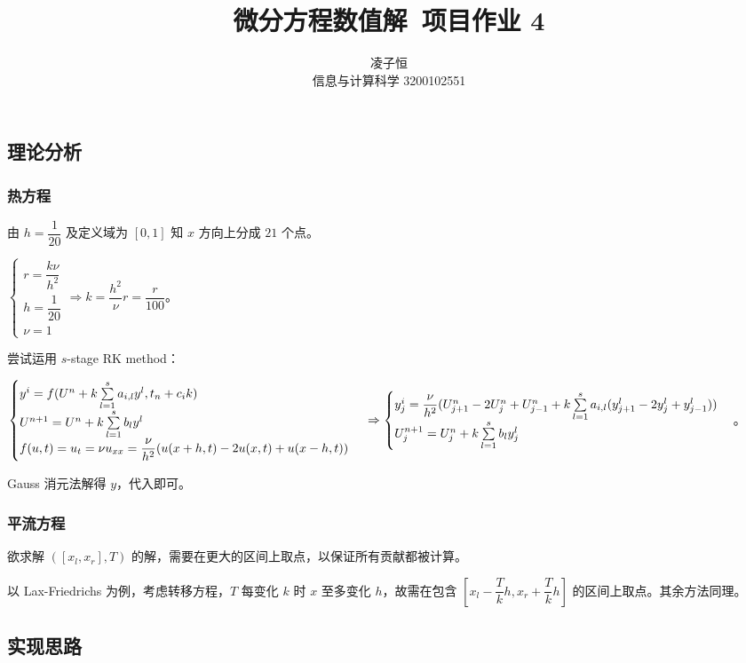 \documentclass[12pt]{ctexart}
\title{微分方程数值解~项目作业 4}
\author{凌子恒 \\ 信息与计算科学 3200102551}
\begin{document}
\maketitle

\subsection*{理论分析}

\subsubsection*{热方程}

由 $h=\dfrac{1}{20}$ 及定义域为 $[0,1]$ 知 $x$ 方向上分成 $21$ 个点。

$\begin{cases}
	r=\dfrac{k\nu}{h^2}\\
	h=\dfrac{1}{20}\\
	\nu=1
\end{cases}\Rightarrow k=\dfrac{h^2}{\nu}r=\dfrac{r}{100}$。

尝试运用 $s$-stage RK method：

$\begin{cases}
	y^i=f(U^n+k\sum\limits_{l=1}^{s}a_{i,l}y^l,t_n+c_ik)\\
	U^{n+1}=U^n+k\sum\limits_{l=1}^s b_ly^l\\
	f(u,t)=u_t=\nu u_{xx}=\dfrac{\nu}{h^2}(u(x+h,t)-2u(x,t)+u(x-h,t))
\end{cases}\\
\Rightarrow\begin{cases}
	y^i_j=\dfrac{\nu}{h^2}(U^n_{j+1}-2U^n_j+U^n_{j-1}+k\sum\limits_{l=1}^sa_{i,l}(y^l_{j+1}-2y^l_j+y^l_{j-1}))\\
	U^{n+1}_j=U^n_j+k\sum\limits_{l=1}^s b_ly^l_j
\end{cases}$。

Gauss 消元法解得 $y$，代入即可。

\subsubsection*{平流方程}

欲求解 $([x_l,x_r],T)$ 的解，需要在更大的区间上取点，以保证所有贡献都被计算。

以 Lax-Friedrichs 为例，考虑转移方程，$T$ 每变化 $k$ 时 $x$ 至多变化 $h$，故需在包含 $[x_l-\dfrac{T}{k}h,x_r+\dfrac{T}{k}h]$ 的区间上取点。其余方法同理。

\subsection*{实现思路}
\end{document}
